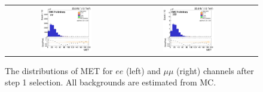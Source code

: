 \begin{figure}[ht]
  \begin{center}
    \begin{tabular}{ccc}
      \includegraphics[width=0.45\textwidth]{figures/tW/fig/Step1/ee_noNvtx/H_MET_Et.png}&
      \includegraphics[width=0.45\textwidth]{figures/tW/fig/Step1/mumu_noNvtx/H_MET_Et.png}\\
    \end{tabular}
    \caption{The distributions of MET for $ee$ (left) and $\mu\mu$ (right) channels after step 1 selection. All backgrounds are estimated from MC.}
    \label{fig:step1_MET_phi}
  \end{center}
\end{figure}


